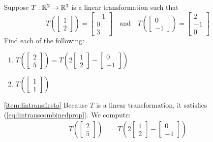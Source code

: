 \documentclass{ximera}
\begin{document}
\begin{example}\label{ex:lintransfirst}
Suppose $T:\mathbb{R}^2\rightarrow \mathbb{R}^3$ is a linear transformation such that 
$$T\left(\begin{bmatrix}1\\2\end{bmatrix}\right)=\begin{bmatrix}-1\\0\\3\end{bmatrix}\quad\text{and}\quad T\left(\begin{bmatrix}0\\-1\end{bmatrix}\right)=\begin{bmatrix}2\\-1\\0\end{bmatrix}$$
Find each of the following:
\begin{enumerate}
    \item \label{item:lintransfirsta} $T\left(\begin{bmatrix}2\\5\end{bmatrix}\right)=T\left(2\begin{bmatrix}1\\2\end{bmatrix}-\begin{bmatrix}0\\-1\end{bmatrix}\right)$
    \item \label{item:lintransfirstb}
    $T\left(\begin{bmatrix}1\\1\end{bmatrix}\right)$
\end{enumerate}
\begin{explanation}
\ref{item:lintransfirsta} Because $T$ is a linear transformation, it satisfies (\ref{eq:lintranscombinedprop}).  We compute:
\begin{align*}
    T\left(\begin{bmatrix}2\\5\end{bmatrix}\right)&=T\left(2\begin{bmatrix}1\\2\end{bmatrix}-\begin{bmatrix}0\\-1\end{bmatrix}\right)\\

\end{align*}
\end{explanation}
\end{example}
\end{document}
